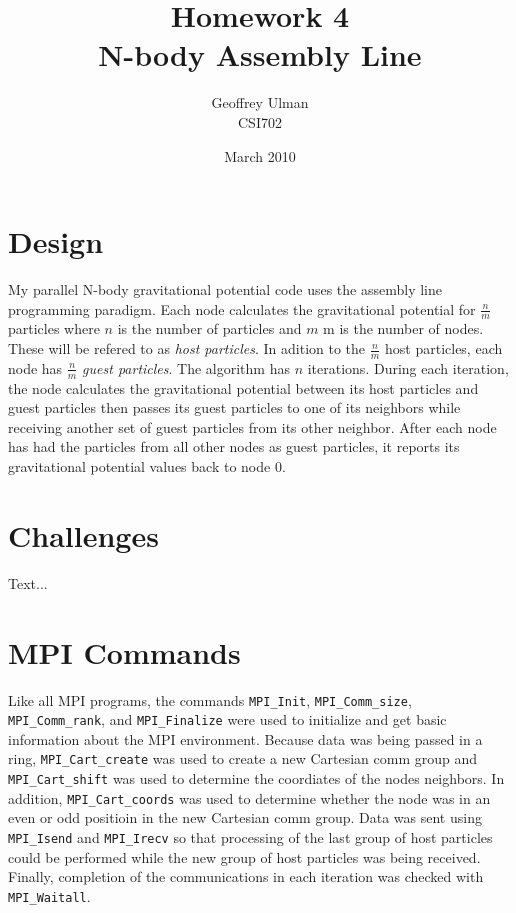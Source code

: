 \documentclass{article}
\begin{document}
\title{Homework 4\\
       N-body Assembly Line}
\author{Geoffrey Ulman\\
        CSI702}
\date{March 2010}
\maketitle

\section{Design}
My parallel N-body gravitational potential code uses the assembly line programming paradigm. Each node calculates the gravitational potential for \( \frac{n}{m} \) particles where \( n \) is the number of particles and \( m \) m is the number of nodes. These will be refered to as \emph{host particles}. In adition to the \( \frac{n}{m} \) host particles, each node has \( \frac{n}{m} \) \emph{guest particles}. The algorithm has \( n \) iterations.
During each iteration, the node calculates the gravitational potential between its host particles and guest particles then passes its guest particles to one of its neighbors while receiving another set of guest particles from its other neighbor. After each node has had the particles from all other nodes as guest particles, it reports its gravitational potential values back to node 0.

\section{Challenges}
Text...

\section{MPI Commands}
Like all MPI programs, the commands \verb!MPI_Init!, \verb!MPI_Comm_size!, \verb!MPI_Comm_rank!, and \verb!MPI_Finalize! were used to initialize and get basic information about the MPI environment. Because data was being passed in a ring, \verb!MPI_Cart_create! was used to create a new Cartesian comm group and \verb!MPI_Cart_shift! was used to determine the coordiates of the nodes neighbors. In addition, \verb!MPI_Cart_coords! was used to determine whether the node was in an even or odd positioin in the new Cartesian comm group. Data was sent using \verb!MPI_Isend! and \verb!MPI_Irecv! so that processing of the last group of host particles could be performed while the new group of host particles was being received. Finally, completion of the communications in each iteration was checked with \verb!MPI_Waitall!.
\end{document}
